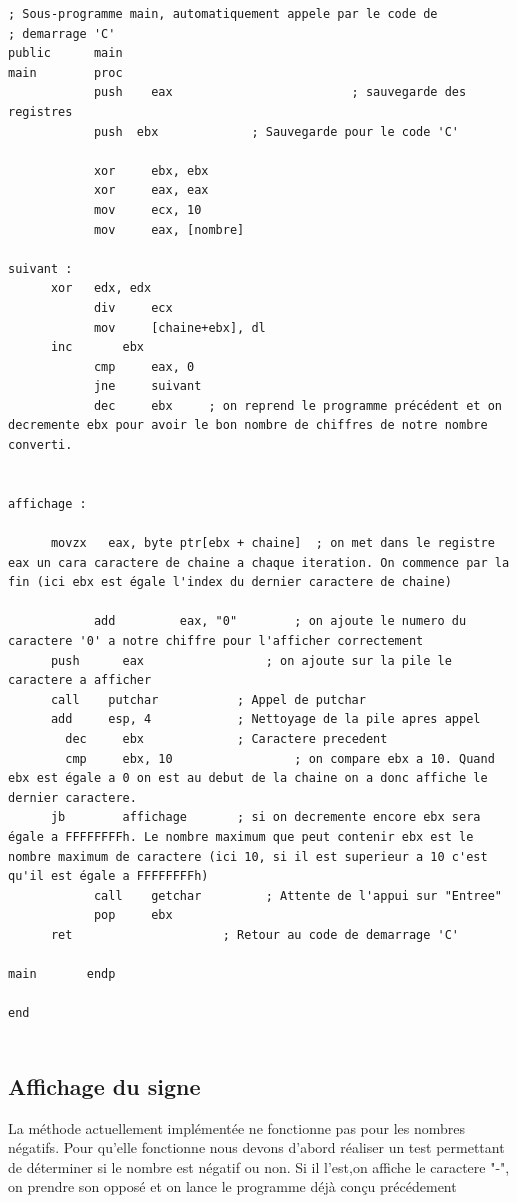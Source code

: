 \documentclass[11pt]{report}
\begin{document}
\begin{lstlisting}
; Sous-programme main, automatiquement appele par le code de
; demarrage 'C'
public      main
main        proc
			push 	eax							; sauvegarde des registres
			push  ebx             ; Sauvegarde pour le code 'C'

			xor		ebx, ebx
			xor		eax, eax
			mov		ecx, 10
			mov		eax, [nombre]

suivant :		
      xor 	edx, edx
			div	    ecx
			mov		[chaine+ebx], dl
      inc		ebx
			cmp		eax, 0
			jne		suivant
			dec		ebx     ; on reprend le programme précédent et on decremente ebx pour avoir le bon nombre de chiffres de notre nombre converti.


affichage : 

      movzx   eax, byte ptr[ebx + chaine]  ; on met dans le registre eax un cara caractere de chaine a chaque iteration. On commence par la fin (ici ebx est égale l'index du dernier caractere de chaine)

			add			eax, "0"        ; on ajoute le numero du caractere '0' a notre chiffre pour l'afficher correctement
      push   	eax         		; on ajoute sur la pile le caractere a afficher
      call    putchar     		; Appel de putchar
      add     esp, 4      		; Nettoyage de la pile apres appel
  		dec     ebx             ; Caractere precedent
	    cmp     ebx, 10 				; on compare ebx a 10. Quand ebx est égale a 0 on est au debut de la chaine on a donc affiche le dernier caractere.
      jb     	affichage       ; si on decremente encore ebx sera égale a FFFFFFFFh. Le nombre maximum que peut contenir ebx est le nombre maximum de caractere (ici 10, si il est superieur a 10 c'est qu'il est égale a FFFFFFFFh)
			call    getchar         ; Attente de l'appui sur "Entree"
			pop     ebx
      ret                     ; Retour au code de demarrage 'C'

main       endp

end


\end{lstlisting}


\subsection{Affichage du signe}

La méthode actuellement implémentée ne fonctionne pas pour les nombres négatifs.
Pour qu'elle fonctionne nous devons d'abord réaliser un test permettant de
déterminer si le nombre est négatif ou non.
Si il l'est,on affiche le caractere "-", on prendre son opposé
et on lance le programme déjà conçu précédement
\end{document}
